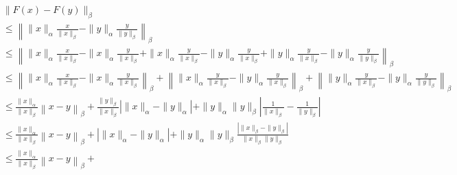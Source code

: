 \documentclass[a4paper]{article}
\begin{document}
    \begin{align*}
        &
        \| 
            F(x) - F(y) 
        \|_{\beta}
        \\&\leq 
        \left\| 
            \| x \|_{\alpha} \frac{ x }{ \| x \|_{\beta} } 
            - 
            \| y \|_{\alpha} \frac{ y }{ \| y \|_{\beta} } 
        \right\|_{\beta}
        \\&\leq 
        \left\| 
            \| x \|_{\alpha} \frac{ x }{ \| x \|_{\beta} } 
            - 
            \| x \|_{\alpha} \frac{ y }{ \| x \|_{\beta} } 
            + 
            \| x \|_{\alpha} \frac{ y }{ \| x \|_{\beta} } 
            - 
            \| y \|_{\alpha} \frac{ y }{ \| x \|_{\beta} } 
            + 
            \| y \|_{\alpha} \frac{ y }{ \| x \|_{\beta} } 
            - 
            \| y \|_{\alpha} \frac{ y }{ \| y \|_{\beta} } 
        \right\|_{\beta}
        \\&\leq 
        \left\| 
            \| x \|_{\alpha} \frac{ x }{ \| x \|_{\beta} } 
            - 
            \| x \|_{\alpha} \frac{ y }{ \| x \|_{\beta} } 
        \right\|_{\beta}
            + 
        \left\| 
            \| x \|_{\alpha} \frac{ y }{ \| x \|_{\beta} } 
            - 
            \| y \|_{\alpha} \frac{ y }{ \| x \|_{\beta} } 
        \right\|_{\beta}
            + 
        \left\| 
            \| y \|_{\alpha} \frac{ y }{ \| x \|_{\beta} } 
            - 
            \| y \|_{\alpha} \frac{ y }{ \| y \|_{\beta} } 
        \right\|_{\beta}
        \\&\leq 
        \frac{ \| x \|_{\alpha} }{ \| x \|_{\beta} } 
        \left\| 
            x - y
        \right\|_{\beta}
            + 
        \frac{ \| y \|_{\beta} }{ \| x \|_{\beta} } 
        \left| \| x \|_{\alpha} - \| y \|_{\alpha} \right|
        + 
        \| y \|_{\alpha} \| y \|_{\beta} 
        \left| 
            \frac{ 1 }{ \| x \|_{\beta} } 
            - 
            \frac{ 1 }{ \| y \|_{\beta} }  
        \right|
        \\&\leq 
        \frac{ \| x \|_{\alpha} }{ \| x \|_{\beta} } 
        \left\| 
            x - y
        \right\|_{\beta}
        + 
        \left| \| x \|_{\alpha} - \| y \|_{\alpha} \right|
        + 
        \| y \|_{\alpha} \| y \|_{\beta} 
        \frac{ \left| \| x \|_{\beta} - \| y \|_{\beta} \right| }{ \| x \|_{\beta} \| y \|_{\beta} }
        \\&\leq 
        \frac{ \| x \|_{\alpha} }{ \| x \|_{\beta} } 
        \left\| 
            x - y
        \right\|_{\beta}
            + 

\end{align*}
\end{document}
